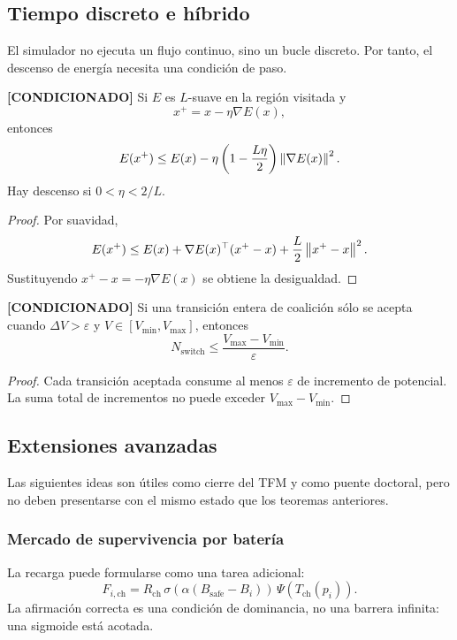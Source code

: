 \subsection{Tiempo discreto e híbrido}

El simulador no ejecuta un flujo continuo, sino un bucle discreto. Por tanto, el
descenso de energía necesita una condición de paso.

\begin{lema} \textbf{[CONDICIONADO]}
Si $E$ es $L$-suave en la región visitada y
\[
  x^+=x-\eta\nabla E(x),
\]
entonces
\[
  E(x^+)\le E(x)-\eta\left(1-\frac{L\eta}{2}\right)\left\|\nabla E(x)\right\|^2.
\]
Hay descenso si $0<\eta<2/L$.
\end{lema}

\begin{proof}
Por suavidad,
\[
  E(x^+)\le E(x)+\nabla E(x)^\top(x^+-x)+\frac{L}{2}\left\|x^+-x\right\|^2.
\]
Sustituyendo $x^+-x=-\eta\nabla E(x)$ se obtiene la desigualdad.
\end{proof}

\begin{proposicion} \textbf{[CONDICIONADO]}
Si una transición entera de coalición sólo se acepta cuando $\Delta V>\varepsilon$ y
$V\in[V_{\min},V_{\max}]$, entonces
\[
  N_{\mathrm{switch}}\le\frac{V_{\max}-V_{\min}}{\varepsilon}.
\]
\end{proposicion}

\begin{proof}
Cada transición aceptada consume al menos $\varepsilon$ de incremento de potencial. La
suma total de incrementos no puede exceder $V_{\max}-V_{\min}$.
\end{proof}

\subsection{Extensiones avanzadas}

Las siguientes ideas son útiles como cierre del TFM y como puente doctoral, pero no deben
presentarse con el mismo estado que los teoremas anteriores.

\subsubsection{Mercado de supervivencia por batería}

La recarga puede formularse como una tarea adicional:
\[
  F_{i,\mathrm{ch}}
  =
  R_{\mathrm{ch}}\,
  \sigma(\alpha(B_{\mathrm{safe}}-B_i))\,
  \Psi(T_{\mathrm{ch}}(p_i)).
\]
La afirmación correcta es una condición de dominancia, no una barrera infinita: una
sigmoide está acotada.

